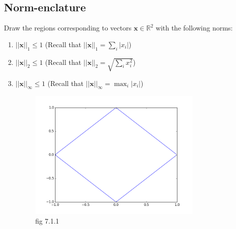 \documentclass[a4paper]{article}
\theoremstyle{definition}
\newcommand{\RR}{\mathbb{R}}
\newenvironment{soln}{
    \leavevmode\color{blue}\ignorespaces
}{}
\begin{document}
\subsection{Norm-enclature}
Draw the regions corresponding to vectors $\mathbf{x}\in\RR^2$ with the following norms:
\begin{enumerate}
	\item 	$||\mathbf{x}||_1\leq 1$ (Recall that $||\mathbf{x}||_1 = \sum_i |x_i|$)
	\item 	$||\mathbf{x}||_2 \leq 1$ (Recall that $||\mathbf{x}||_2 =\sqrt{\sum_i x_i^2}$)
	\item 	$||\mathbf{x}||_\infty \leq 1$ (Recall that $||\mathbf{x}||_\infty = \max_i |x_i|$)
	
	\begin{soln}
	   \begin{figure}[h!]	   
	       \centering
	       \begin{minipage}[c]{0.3\textwidth}
	       \centering
	       \includegraphics[width=0.8\textwidth,height=0.8\textwidth]{hw1_7_1_1.png}  
	       \captionsetup{labelformat=empty}
	       \caption{fig 7.1.1}
	       \label{fig:7.1.1}
	       \end{minipage}
	       \hfill
	       \begin{minipage}[c]{0.3\textwidth}
	       \centering

\end{minipage}
\end{figure}
\end{soln}
\end{enumerate}
\end{document}
